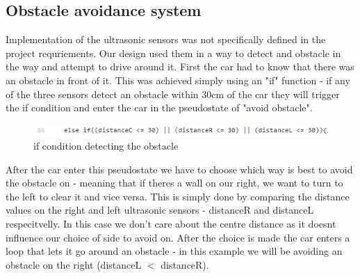 \documentclass[conference]{IEEEtran}
\begin{document}
\subsection{Obstacle avoidance system}
Implementation of the ultrasonic sensors was not specifically defined in the project requriements. Our design used them in a way to detect and obstacle in the way and attempt to drive around it. First the car had to know that there was an obstacle in front of it. This was achieved simply using an "if" function - if any of the three sensors detect an obstacle within 30cm of the car they will trigger the if condition and enter the car in the pseudostate of "avoid obstacle".
\begin{figure}[h!]
	\includegraphics[width=\linewidth]{examplecode2.png}
	\caption{if condition detecting the obstacle}
	\label{fig:EXC2}
\end{figure}
After the car enter this pseudostate we have to choose which way is best to avoid the obstacle on - meaning that if theres a wall on our right, we want to turn to the left to clear it and vice versa. This is simply done by comparing the distance values on the right and left ultrasonic sensors - distanceR and distanceL respecitvelly. In this case we don't care about the centre distance as it doesnt influence our choice of side to avoid on. After the choice is made the car enters a loop that lets it go around an obstacle - in this example we will be avoiding an obstacle on the right (distanceL $<$ distanceR).
\end{document}
